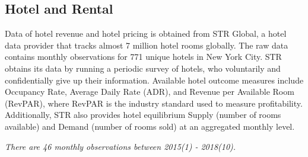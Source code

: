 \documentclass[12pt]{article}
\begin{document}
		
		\subsection{Hotel and Rental}
			Data of hotel revenue and hotel pricing is obtained from STR Global, a hotel data provider that tracks almost 7 million hotel rooms globally. The raw data contains monthly observations for 771 unique hotels in New York City. STR obtains its data by running a periodic survey of hotels, who voluntarily and confidentially give up their information. Available hotel outcome measures include Occupancy Rate, Average Daily Rate (ADR), and Revenue per Available Room (RevPAR), where RevPAR is  the industry standard used to measure profitability. Additionally, STR also provides hotel equilibrium Supply (number of rooms available) and Demand (number of rooms sold) at an aggregated monthly level.
			
		\begin{table}[!htbp]  %
			\begin{center}
  				\caption{Descriptive Statistics for Hotel (2015 - 2018)}
				\label{tab:HotelStat} 
			\end{center}
			\emph{There are 46 monthly observations between 2015(1) - 2018(10).}
			\vspace{.1in}
		\end{table}
		
\end{document}
